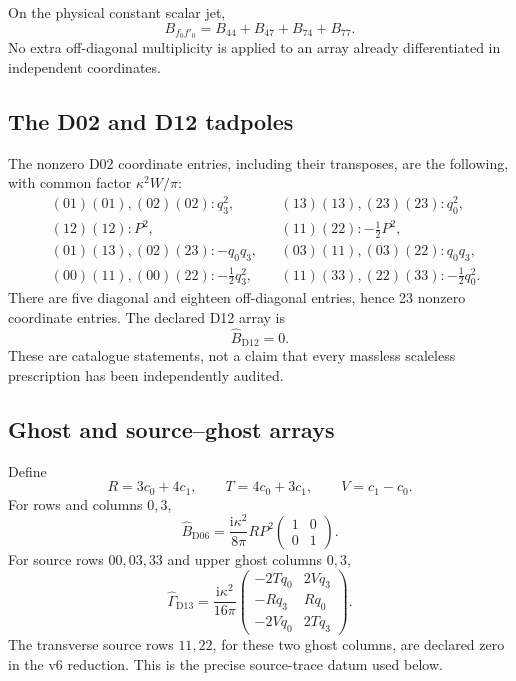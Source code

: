 \documentclass[11pt,a4paper]{article}
\newcommand{\ii}{\mathrm i}
\newcommand{\ka}{\kappa}
\theoremstyle{plain}
\theoremstyle{definition}
\theoremstyle{remark}
\numberwithin{equation}{section}
\begin{document}
On the physical constant scalar jet,
\[
 B_{f_0f'_0}=B_{44}+B_{47}+B_{74}+B_{77}.
\]
No extra off-diagonal multiplicity is applied to an array already
differentiated in independent coordinates.

\subsection{The D02 and D12 tadpoles}

The nonzero D02 coordinate entries, including their transposes,
are the following, with common factor \(\ka^2W/\pi\):
\begin{align*}
 &(01)(01),(02)(02):q_3^2,
 &&(13)(13),(23)(23):q_0^2,\\
 &(12)(12):P^2,
 &&(11)(22):-\tfrac12P^2,\\
 &(01)(13),(02)(23):-q_0q_3,
 &&(03)(11),(03)(22):q_0q_3,\\
 &(00)(11),(00)(22):-\tfrac12q_3^2,
 &&(11)(33),(22)(33):-\tfrac12q_0^2.
\end{align*}
There are five diagonal and eighteen off-diagonal entries,
hence 23 nonzero coordinate entries.
The declared D12 array is
\[
 \widehat B_{\mathrm{D12}}=0.
\]
These are catalogue statements, not a claim that every massless
scaleless prescription has been independently audited.

\subsection{Ghost and source--ghost arrays}

Define
\begin{equation}
 R=3c_0+4c_1,\qquad
 T=4c_0+3c_1,\qquad
 V=c_1-c_0.
 \label{eq:RTV}
\end{equation}
For rows and columns \(0,3\),
\begin{equation}
 \widehat B_{\mathrm{D06}}
 =\frac{\ii\ka^2}{8\pi}RP^2
   \begin{pmatrix}1&0\\0&1\end{pmatrix}.
 \label{eq:D06}
\end{equation}
For source rows \(00,03,33\) and upper ghost columns \(0,3\),
\begin{equation}
 \widehat\Gamma_{\mathrm{D13}}
 =\frac{\ii\ka^2}{16\pi}
 \begin{pmatrix}
 -2Tq_0&2Vq_3\\
 -Rq_3&Rq_0\\
 -2Vq_0&2Tq_3
 \end{pmatrix}.
 \label{eq:D13}
\end{equation}
The transverse source rows \(11,22\), for these two ghost
columns, are declared zero in the v6 reduction.
This is the precise source-trace datum used below.
\end{document}
